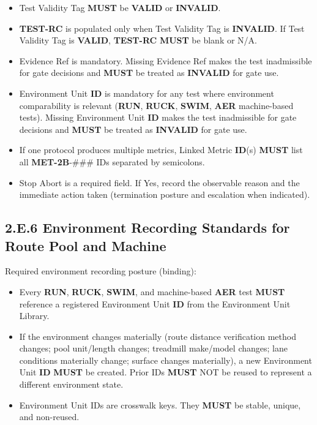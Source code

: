 \documentclass[10pt]{article}
\begin{document}
\begin{landscape}
\begin{itemize}
\item Test Validity Tag \textbf{MUST} be \textbf{VALID} or \textbf{INVALID}.
\item \textbf{TEST-RC} is populated only when Test Validity Tag is \textbf{INVALID}. If Test Validity Tag is \textbf{VALID}, \textbf{TEST-RC} \textbf{MUST} be blank or N/A.
\item Evidence Ref is mandatory. Missing Evidence Ref makes the test inadmissible for gate decisions and \textbf{MUST} be treated as \textbf{INVALID} for gate use.
\item Environment Unit \textbf{ID} is mandatory for any test where environment comparability is relevant (\textbf{RUN}, \textbf{RUCK}, \textbf{SWIM}, \textbf{AER} machine-based tests). Missing Environment Unit \textbf{ID} makes the test inadmissible for gate decisions and \textbf{MUST} be treated as \textbf{INVALID} for gate use.
\item If one protocol produces multiple metrics, Linked Metric \textbf{ID}(s) \textbf{MUST} list all \textbf{MET-2B}-### IDs separated by semicolons.
\item Stop Abort is a required field. If Yes, record the observable reason and the immediate action taken (termination posture and escalation when indicated).
\end{itemize}

\subsection*{2.E.6 Environment Recording Standards for Route Pool and Machine}
{}

Required environment recording posture (binding):

\begin{itemize}
\item Every \textbf{RUN}, \textbf{RUCK}, \textbf{SWIM}, and machine-based \textbf{AER} test \textbf{MUST} reference a registered Environment Unit \textbf{ID} from the Environment Unit Library.
\item If the environment changes materially (route distance verification method changes; pool unit/length changes; treadmill make/model changes; lane conditions materially change; surface changes materially), a new Environment Unit \textbf{ID} \textbf{MUST} be created. Prior IDs \textbf{MUST} NOT be reused to represent a different environment state.
\item Environment Unit IDs are crosswalk keys. They \textbf{MUST} be stable, unique, and non-reused.
\end{itemize}


\end{landscape}
\end{document}
